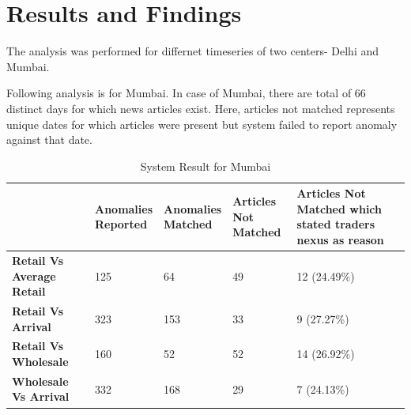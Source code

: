 \documentclass[a4paper,10pt]{article}
\begin{document}
\section{Results and Findings}



The analysis was performed for differnet timeseries of two centers- Delhi and Mumbai.

Following analysis is for Mumbai. In case of Mumbai, there are total of 66 distinct days for which news articles exist. Here, articles not matched represents unique dates for which articles were present but system failed to report anomaly against that date.
\begin{table}[H]
\centering

\begin{tabular}{| L{3cm} | L{3cm} | L{3cm} | L{3cm} | L{3cm} |}
\hline                                 
				  & \textbf{Anomalies \newline Reported} & \textbf{Anomalies \newline Matched}  & \textbf{Articles \newline Not Matched}   & \textbf{Articles Not Matched which stated traders nexus as reason} \\ \hline
\textbf{Retail Vs Average Retail} & 125                         & 64                          &  49                		&  12 (24.49\%)                \\ \hline
\textbf{Retail Vs Arrival}        & 323                         & 153                         &  33                		&  9  (27.27\%)              \\ \hline
\textbf{Retail Vs Wholesale}      & 160                         & 52                          &  52                		&  14 (26.92\%)               \\ \hline
\textbf{Wholesale Vs Arrival}     & 332                         & 168                         &  29                		&  7  (24.13\%)              \\ \hline
\end{tabular}
\caption{System Result for Mumbai}
\label{result}
\end{table}
\end{document}
